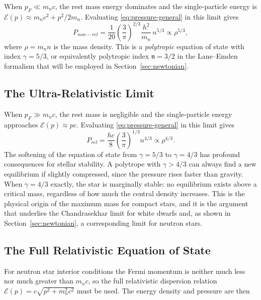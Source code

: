 When $p_F \ll m_n c$, the rest mass energy dominates and the
single-particle energy is $\mathcal{E}(p) \approx m_n c^2 + p^2/2m_n$.
Evaluating \ref{eq:pressure-general} in this limit gives
%
\begin{equation}
    P_{non-rel}
      = \frac{1}{20}\left(\frac{3}{\pi}\right)^{2/3}
        \frac{h^2}{m_n}\,n^{5/3}
      \propto \rho^{5/3},
    \label{eq:eos-nr}
\end{equation}
%
where $\rho = m_n n$ is the mass density. This is a \emph{polytropic}
equation of state with index $\gamma = 5/3$, or equivalently polytropic
index $\mathfrak{n} = 3/2$ in the Lane--Emden formalism that will be
employed in Section~\ref{sec:newtonian}.
 
\subsection{The Ultra-Relativistic Limit}
 
When $p_F \gg m_n c$, the rest mass is negligible and the single-particle
energy approaches $\mathcal{E}(p) \approx pc$. Evaluating
\eqref{eq:pressure-general} in this limit gives
%
\begin{equation}
    P_{rel}
      = \frac{hc}{8}\left(\frac{3}{\pi}\right)^{1/3} n^{4/3}
      \propto \rho^{4/3}.
    \label{eq:eos-ur}
\end{equation}
%
The softening of the equation of state from $\gamma = 5/3$ to
$\gamma = 4/3$ has profound consequences for stellar stability. A
polytrope with $\gamma > 4/3$ can always find a new equilibrium if
slightly compressed, since the pressure rises faster than gravity.
When $\gamma = 4/3$ exactly, the star is marginally stable: no
equilibrium exists above a critical mass, regardless of how much the
central density increases. This is the physical origin of the maximum
mass for compact stars, and it is the argument that underlies the
Chandrasekhar limit for white dwarfs and, as shown in
Section~\ref{sec:newtonian}, a corresponding limit for neutron stars.
 
\subsection{The Full Relativistic Equation of State}
 
For neutron star interior conditions the Fermi momentum is
neither much less nor much greater than $m_n c$, so the full
relativistic dispersion relation $\mathcal{E}(p) = c\sqrt{p^2 + m_n^2 c^2}$
must be used. The energy density and pressure are then

